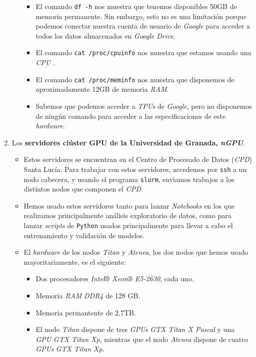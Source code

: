 \begin{enumerate}
\begin{itemize}
		            \begin{itemize}
			            \item El comando \lstinline{df -h} nos muestra que tenemos disponibles 50GB de memoria permanente. Sin embargo, esto no es una limitación porque podemos conectar nuestra cuenta de usuario de \textit{Google} para acceder a todos los datos almacenados en \textit{Google Drive}.
			            \item El comando \lstinline{cat /proc/cpuinfo} nos muestra que estamos usando una \textit{CPU} .
			            \item El comando \lstinline{cat /proc/meminfo} nos muestra que disponemos de aproximadamente 12GB de memoria \textit{RAM}.
			            \item Sabemos que podemos acceder a \textit{TPUs} de \textit{Google}, pero no disponemos de ningún comando para acceder a las especificaciones de este \textit{hardware}.
		            \end{itemize}
	      \end{itemize}

	\item Los \textbf{servidores clúster GPU de la Universidad de Granada, \textit{nGPU}}.
	      \begin{itemize}
		      \item Estos servidores se encuentran en el Centro de Procesado de Datos (\textit{CPD}) Santa Lucía. Para trabajar con estos servidores, accedemos por \lstinline{ssh} a un nodo cabecera, y usando el programa \lstinline{slurm}, enviamos trabajos a los distintos nodos que componen el \textit{CPD}.
		      \item Hemos usado estos servidores tanto para lanzar \textit{Notebooks} en los que realizamos principalmente análisis exploratorio de datos, como para lanzar \textit{scripts} de \lstinline{Python} usados principalmente para llevar a cabo el entrenamiento y validación de modelos.
		      \item El \textit{hardware} de los nodos \textit{Titan} y \textit{Atenea}, los dos nodos que hemos usado mayoritariamente, es el siguiente:
		            \begin{itemize}
			            \item Dos procesadores \textit{Intel® Xeon® E5-2630}, cada uno.
			            \item Memoria \textit{RAM} \textit{DDR4} de 128 GB.
			            \item Memoria permantente de 2,7TB.
			            \item El nodo \textit{Titan} dispone de tres \textit{GPUs} \textit{GTX Titan X Pascal} y una \textit{GPU} \textit{GTX Titan Xp}, mientras que el nodo \textit{Atenea} dispone de cuatro \textit{GPUs} \textit{GTX Titan Xp}.
		            \end{itemize}
	      \end{itemize}

\end{enumerate}


